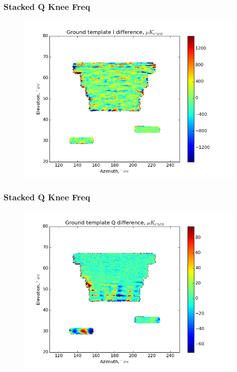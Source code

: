\documentclass{beamer}
\begin{document}
\begin{frame}
\frametitle{Stacked Q Knee Freq}
\begin{figure}
\includegraphics[width=0.9\linewidth]{dI_gt_STACK_Q_FKNEE.png}
\end{figure}
\end{frame}

\begin{frame}
\frametitle{Stacked Q Knee Freq}
\begin{figure}
\includegraphics[width=0.9\linewidth]{dQ_gt_STACK_Q_FKNEE.png}
\end{figure}
\end{frame}
\end{document}
